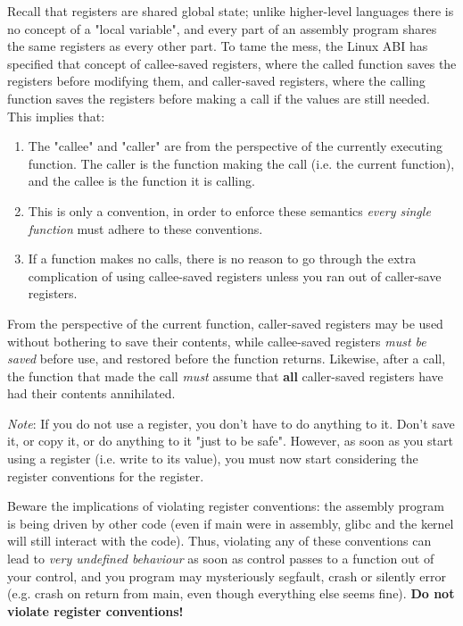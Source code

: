 \documentclass[11pt]{article}
\begin{document}
Recall that registers are shared global state; unlike higher-level languages there is no
concept of a "local variable", and every part of an assembly program shares the same
registers as every other part. To tame the mess, the Linux ABI has specified that concept
of callee-saved registers, where the called function saves the registers before
modifying them, and caller-saved registers, where the calling function saves the registers
before making a call if the values are still needed. This implies that:

\begin{enumerate}
    \item The "callee" and "caller" are from the perspective of the currently executing
        function. The caller is the function making the call (i.e. the current function),
        and the callee is the function it is calling.
    \item This is only a convention, in order to enforce these semantics \emph{every
        single function} must adhere to these conventions.
    \item If a function makes no calls, there is no reason to go through the extra
        complication of using callee-saved registers unless you ran out of caller-save
        registers.
\end{enumerate}

From the perspective of the current function, caller-saved registers may be used
without bothering to save their contents, while callee-saved registers \emph{must be
saved} before use, and restored before the function returns. Likewise, after a call, the
function that made the call \emph{must} assume that \textbf{all} caller-saved registers
have had their contents annihilated.

\emph{Note}: If you do not use a register, you don't have to do anything to it. Don't save it, or
copy it, or do anything to it "just to be safe". However, as soon as you start using a
register (i.e. write to its value), you must now start considering the register
conventions for the register.

Beware the implications of violating register conventions: the assembly program is being
driven by other code (even if main were in assembly, glibc and the kernel will still
interact with the code). Thus, violating any of these conventions can lead to \emph{very
undefined behaviour} as soon as control passes to a function out of your control, and
you program may mysteriously segfault, crash or silently error (e.g. crash on return
from main, even though everything else seems fine). \textbf{Do not violate register
conventions!}
\end{document}
